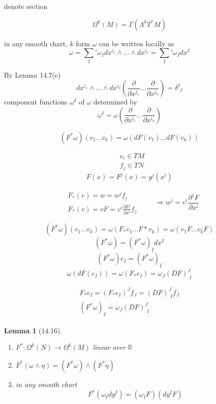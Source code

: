 \documentclass[11pt]{amsart}
\newtheorem{lemma}{Lemma}
\theoremstyle{definition}
\begin{document}
denote section

\[
\Omega^k{ (M) } = \Gamma{ (\Lambda^k T^* M ) }
\]



in any smooth chart, $k$ form $\omega$ can be written locally as
\[
\omega = \sum_I' \omega_I dx^{i_1} \wedge \dots \wedge dx^{i_k} = \sum_I' \omega_I dx^I
\]

By Lemma 14.7(c)
\[
dx^{i_1} \wedge \dots \wedge dx^{i_k} \left( \frac{ \partial }{ \partial x^{j_1} } \dots \frac{ \partial }{ \partial x^{j_k} } \right) = \delta^I_{\, \, J}
\]
component functions $\omega^I$ of $\omega$ determined by
\[
\omega^I = \omega\left( \frac{ \partial }{ \partial x^{i_1} } \dots \frac{ \partial }{ \partial x^{i_k} } \right)
\]

\[
(F^* \omega)(v_1 \dots v_k) = \omega( dF(v_1) \dots dF(v_k) )
\]

\[
\begin{aligned}
  & e_i \in TM \\
  & f_j \in TN
\end{aligned}
\]
\[
F(x) = F^j(x) = y^j( x^i)
\]

\[
\begin{aligned}
  & F_*(v) = w = w^j f_j \\
  & F_*(v) = vF = v^i \frac{ \partial F^j}{ \partial x^i } f_j
\end{aligned} \quad \quad \, \Longrightarrow w^j = v^i \frac{ \partial^j F}{ \partial x^i}
\]

\[
(F^*\omega)(v_1 \dots v_k)  = \omega(F_*v_1 \dots F*v_k) = \omega(v_1 F \dots v_k F)
\]
\[
(F^*\omega) = (F^* \omega)_{ \underline{I}} dx^{ \underline{I}}
\]
\[
(F^* \omega) e_I = (F^* \omega)_{\underline{I}}
\]
\[
\omega(dF(e_I)) = \omega(F_* e_I) = \omega_{\underline{J}}(DF)^{\underline{J}}_{ \, \, I }
\]

\[
\begin{gathered}
  F_*e_I = (F_* e_I)^J f_J = (DF)^J_{ \, \, I } f_J \\
 (F^* \omega)_{\underline{I}} = \omega_{\underline{J}} (DF)^{\underline{J}}_{ \, \, I }
\end{gathered}
\]



\begin{lemma}[14.16]
\begin{enumerate}
  \item[(a)] $F^* : \Omega^k(N) \to \Omega^k(M)$ linear over $\mathbb{R}$
\item[(b)] $F^*(\omega \wedge \eta) = (F^* \omega) \wedge (F^* \eta)$
\item[(c)] in any smooth chart
\[
F^*( \omega_{\underline{I}} dy^{\underline{I}} ) = (\omega_{\underline{I}} F) ( dy^{ \underline{I}} F)
\]
\end{enumerate}
\end{lemma}
\end{document}
